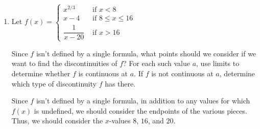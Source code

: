 \documentclass{article}
\begin{document}
\begin{enumerate}[resume]
  \begin{solution}
    Since $f(x)$ is an algebraic formula, $f$ is only discontinuous when $f(x)$ is undefined.
    The only value where this occurs is $x=0$. Let's find the one-sided limits as $x \to 0$.

    As $x$ approaches $0$ from the left, since $x$ is negative, $|x| = -x$, so
    \begin{align*}
        \lim_{x\to 0^-} \frac{x^2+2x}{|x|} &= \lim_{x\to 0^-} \frac{x^2+2x}{-x} \\
        &= \lim_{x\to 0^-} -(x+2) \\
        &= -2.
    \end{align*}
    
    As $x$ approaches $0$ from the right, since $x$ is positive, $|x| = x$, so
    \begin{align*}
        \lim_{x\to 0^+} \frac{x^2+2x}{|x|} &= \lim_{x\to 0^+} \frac{x^2+2x}{x} \\
        &= \lim_{x\to 0^+} (x+2) \\
        &= 2.
    \end{align*}

    Since both one-sided limits exist but $\lim\limits_{x \to 0} f(x)$ does not exist,
    $x=0$ is a jump discontinuity.
    
  \end{solution}

\item 
  \begin{problem}[\vfill]
    Let $f(x) =
    \begin{cases}
      x^{2/3} & \text{ if } x < 8 \\
      x - 4 & \text{ if } 8 \leq x \leq 16 \\
      \dfrac{1}{x - 20} & \text{ if } x > 16
    \end{cases}$

    Since $f$ isn't defined by a single formula, what points should we consider if we want to find the discontinuities of $f$? For each such value $a$, use limits to determine whether $f$ is continuous at $a$. If $f$ is not continuous at $a$, determine which type of discontinuity $f$ has there.
  \end{problem}

  \begin{solution}
    Since $f$ isn't defined by a single formula, in addition to any values for which $f(x)$ 
    is undefined, we should consider the endpoints of the various pieces. Thus, we
    should consider the $x$-values $8$, $16$, and $20$. 


\end{solution}
\end{enumerate}
\end{document}
